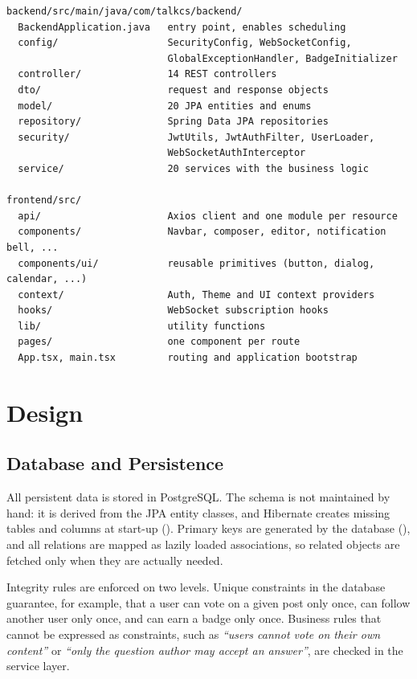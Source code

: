\begin{lstlisting}[language={},numbers=none,caption={Source code layout},label={lst:tree}]
backend/src/main/java/com/talkcs/backend/
  BackendApplication.java   entry point, enables scheduling
  config/                   SecurityConfig, WebSocketConfig,
                            GlobalExceptionHandler, BadgeInitializer
  controller/               14 REST controllers
  dto/                      request and response objects
  model/                    20 JPA entities and enums
  repository/               Spring Data JPA repositories
  security/                 JwtUtils, JwtAuthFilter, UserLoader,
                            WebSocketAuthInterceptor
  service/                  20 services with the business logic

frontend/src/
  api/                      Axios client and one module per resource
  components/               Navbar, composer, editor, notification bell, ...
  components/ui/            reusable primitives (button, dialog, calendar, ...)
  context/                  Auth, Theme and UI context providers
  hooks/                    WebSocket subscription hooks
  lib/                      utility functions
  pages/                    one component per route
  App.tsx, main.tsx         routing and application bootstrap
\end{lstlisting}

\section{Design}

\subsection{Database and Persistence}

All persistent data is stored in PostgreSQL. The schema is not maintained by hand:
it is derived from the JPA entity classes, and Hibernate creates missing tables and
columns at start-up (). Primary keys are generated by the
database (), and all relations are mapped as lazily loaded
 associations, so related objects are fetched only when they are
actually needed.

Integrity rules are enforced on two levels. Unique constraints in the database
guarantee, for example, that a user can vote on a given post only once, can follow
another user only once, and can earn a badge only once. Business rules that cannot be
expressed as constraints, such as \emph{``users cannot vote on their own content''} or
\emph{``only the question author may accept an answer''}, are checked in the service
layer.

